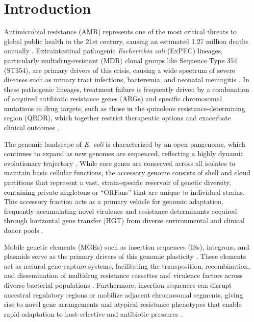\documentclass[pdflatex,sn-mathphys-num]{sn-jnl}
\begin{document}

\maketitle


\section{Introduction}\label{sec:introduction}
Antimicrobial resistance (AMR) represents one of the most critical threats to global public health in the 21st century, causing an estimated 1.27 million deaths annually \cite{murray2022global}. Extraintestinal pathogenic \textit{Escherichia coli} (ExPEC) lineages, particularly multidrug-resistant (MDR) clonal groups like Sequence Type 354 (ST354), are primary drivers of this crisis, causing a wide spectrum of severe diseases such as urinary tract infections, bacteremia, and neonatal meningitis \cite{marin2020expec,fuga2024hybrid}. In these pathogenic lineages, treatment failure is frequently driven by a combination of acquired antibiotic resistance genes (ARGs) and specific chromosomal mutations in drug targets, such as those in the quinolone resistance-determining region (QRDR), which together restrict therapeutic options and exacerbate clinical outcomes \cite{bortolaia2020resfinder,feldgarden2019val}.

The genomic landscape of \textit{E. coli} is characterized by an open pangenome, which continues to expand as new genomes are sequenced, reflecting a highly dynamic evolutionary trajectory \cite{touchon2009organised,ghalayini2022distinct}. While core genes are conserved across all isolates to maintain basic cellular functions, the accessory genome consists of shell and cloud partitions that represent a vast, strain-specific reservoir of genetic diversity, containing private singletons or ``ORFans'' that are unique to individual strains. This accessory fraction acts as a primary vehicle for genomic adaptation, frequently accumulating novel virulence and resistance determinants acquired through horizontal gene transfer (HGT) from diverse environmental and clinical donor pools \cite{partridge2018mobile,silva2022evolutionary}.

Mobile genetic elements (MGEs) such as insertion sequences (ISs), integrons, and plasmids serve as the primary drivers of this genomic plasticity \cite{partridge2018mobile,gillings2015class}. These elements act as natural gene-capture systems, facilitating the transposition, recombination, and dissemination of multidrug resistance cassettes and virulence factors across diverse bacterial populations \cite{carattoli2013plasmid,robertson2020mob}. Furthermore, insertion sequences can disrupt ancestral regulatory regions or mobilize adjacent chromosomal segments, giving rise to novel gene arrangements and atypical resistance phenotypes that enable rapid adaptation to host-selective and antibiotic pressures \cite{xie2017isescan,bouvier2022integronfinder}.
\end{document}
